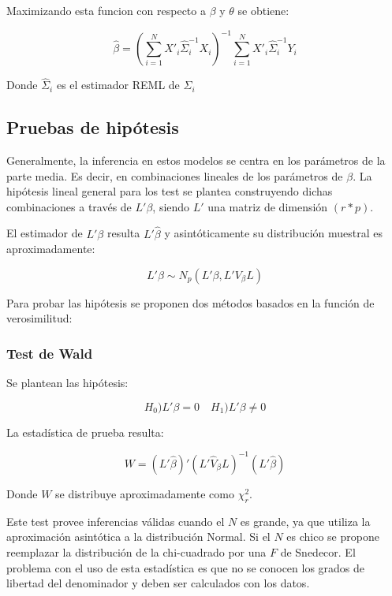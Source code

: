 \documentclass[spanish]{article}
\numberwithin{figure}{subsection}
\numberwithin{equation}{subsection}
\numberwithin{table}{subsection}
\begin{document}
Maximizando esta funcion con respecto a $\beta$ y $\theta$ se obtiene:

\[ \hat{\beta} = (\sum_{i=1}^{N} X'_i \hat{\varSigma}_i^{-1} X_i)^{-1} \sum_{i=1}^{N} X'_i \hat{\varSigma}_i^{-1} Y_i\]

Donde $\hat{\varSigma}_i$ es el estimador REML de ${\varSigma_i}$

\subsection{Pruebas de hipótesis}

Generalmente, la inferencia en estos modelos se centra en los parámetros de la parte media. Es decir, en combinaciones
lineales de los parámetros de $\beta$. La hipótesis lineal general para los test se plantea construyendo dichas combinaciones
a través de $L'\beta$, siendo $L'$ una matriz de dimensión $(r*p)$.

El estimador de $L'\beta$ resulta $L'\hat{\beta}$ y asintóticamente su distribución muestral es aproximadamente:

\[ L'\beta \sim N_p(L'\beta, L'V_{\beta}L) \]

Para probar las hipótesis se proponen dos métodos basados en la función de verosimilitud:

\subsubsection{Test de Wald}

Se plantean las hipótesis:

\[ H_0) L'\beta = 0 \quad H_1) L'\beta \neq 0 \]

La estadística de prueba resulta:

\[ W = (L'\hat{\beta})' (L'\hat{V}_{\beta}L)^{-1} (L'\hat{\beta}) \]

Donde $W$ se distribuye aproximadamente como $\chi_r^2$.

Este test provee inferencias válidas cuando el $N$ es grande, ya que utiliza la aproximación asintótica a la distribución
Normal. Si el $N$ es chico se propone reemplazar la distribución de la chi-cuadrado por una $F$ de Snedecor. El problema
con el uso de esta estadística es que no se conocen los grados de libertad del denominador y deben ser calculados con los
datos. 

\end{document}

